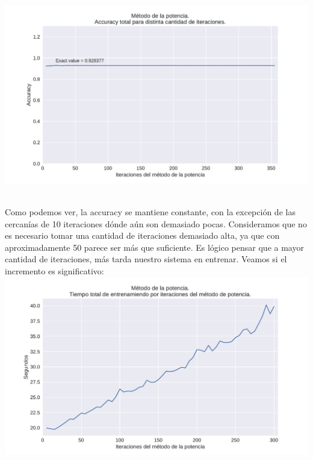 {\centering
    \includegraphics[scale=0.60]{informe/imagenes/potencia/accuracyPorIters.pdf} \\
}
$ $\newline

Como podemos ver, la accuracy se mantiene constante, con la excepción de las cercanías de 10 iteraciones dónde aún son demasiado pocas. Consideramos que no es necesario tomar una cantidad de iteraciones demasiado alta, ya que con aproximadamente 50 parece ser más que suficiente. Es lógico pensar que a mayor cantidad de iteraciones, más tarda nuestro sistema en entrenar. Veamos si el incremento es significativo: \\

{\centering
    \includegraphics[scale=0.60]{informe/imagenes/potencia/tiempoPorIters.pdf} \\
}
$ $\newline

